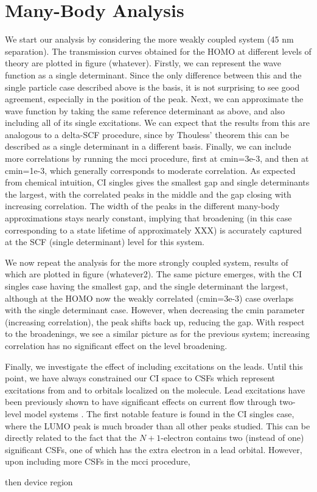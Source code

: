 \section{Many-Body Analysis}

We start our analysis by considering the more weakly coupled system (45
nm separation). The transmission curves obtained for the \ac{HOMO} at
different levels of theory are plotted in figure (whatever). Firstly,
we can represent the wave function as a single determinant. Since the
only difference between this and the single particle case described above
is the basis, it is not surprising to see good agreement, especially in
the position of the peak. Next, we can approximate the wave function by
taking the same reference determinant as above, and also including all
of its single excitations. We can expect that the results from this are
analogous to a delta-SCF procedure, since by Thouless' theorem this can
be described as a single determinant in a different basis. Finally, we
can include more correlations by running the mcci procedure, first at
cmin=3e-3, and then at cmin=1e-3, which generally corresponds to moderate
correlation. As expected from chemical intuition, CI singles gives the
smallest gap and single determinants the largest, with the correlated
peaks in the middle and the gap closing with increasing correlation.
The width of the peaks in the different many-body approximations stays
nearly constant, implying that broadening (in this case corresponding
to a state lifetime of approximately XXX) is accurately captured at the
SCF (single determinant) level for this system.

We now repeat the analysis for the more strongly coupled system, results
of which are plotted in figure (whatever2). The same picture emerges,
with the CI singles case having the smallest gap, and the single determinant
the largest, although at the \ac{HOMO} now the weakly correlated (cmin=3e-3)
case overlaps with the single determinant case. However, when decreasing
the cmin parameter (increasing correlation), the peak shifts back up,
reducing the gap. With respect to the broadenings, we see a similar
picture as for the previous system; increasing correlation has no
significant effect on the level broadening.

Finally, we investigate the effect of including excitations on the leads.
Until this point, we have always constrained our CI space to \acp{CSF}
which represent excitations from and to orbitals localized on the molecule.
Lead excitations have been previously shown to have significant effects
on current flow through two-level model systems
\cite{galperin_nitzan2006leadexcitations}. 
The first notable feature is found in the CI singles case, where the
\ac{LUMO} peak is much broader than all other peaks studied. This can
be directly related to the fact that the $N+1$-electron contains two
(instead of one) significant CSFs, one of which has the extra electron
in a lead orbital. However, upon including more CSFs in the mcci procedure,


then device region
